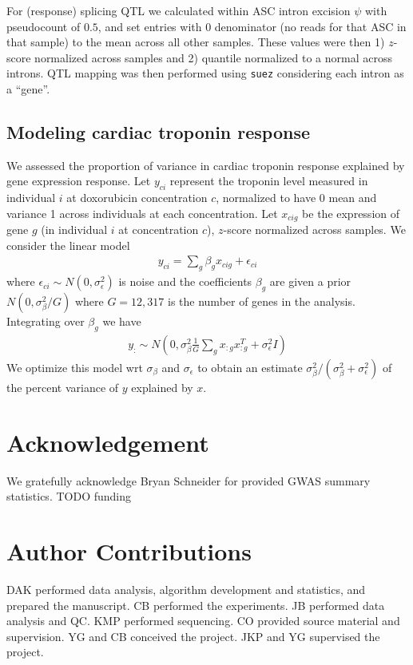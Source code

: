 \documentclass{article}
\begin{document}
{For (response) splicing QTL we calculated within ASC intron excision $\psi$ with pseudocount of $0.5$, and set entries with $0$ denominator (no reads for that ASC in that sample) to the mean across all other samples. These values were then 1) $z$-score normalized across samples and 2) quantile normalized to a normal across introns. QTL mapping was then performed using \texttt{suez} considering each intron as a ``gene''. 

\subsection*{Modeling cardiac troponin response}

We assessed the proportion of variance in cardiac troponin response explained by gene expression response. Let $y_{ci}$ represent the troponin level measured in individual $i$ at doxorubicin concentration $c$, normalized to have 0 mean and variance 1 across individuals at each concentration. Let $x_{cig}$ be the expression of gene $g$ (in individual $i$ at concentration $c$), $z$-score normalized across samples. We consider the linear model 
\begin{align}
y_{ci} = \sum_g \beta_g x_{cig} + \epsilon_{ci}
\end{align}
where $\epsilon_{ci} \sim N(0,\sigma_\epsilon^2)$ is noise and the coefficients $\beta_g$ are given a prior $N(0, \sigma_\beta^2 / G )$ where $G=12,317$ is the number of genes in the analysis. Integrating over $\beta_g$ we have 
\begin{align}
y_{:} \sim N\left(0 , \sigma_\beta^2 \frac{1}{G} \sum_g x_{:g} x_{:g}^T + \sigma_\epsilon^2 I \right)
\end{align}
We optimize this model wrt $\sigma_\beta$ and $\sigma_\epsilon$ to obtain an estimate $\sigma_\beta^2 / (\sigma_\beta^2 + \sigma_\epsilon^2)$ of the percent variance of $y$ explained by $x$. 

\section*{Acknowledgement}

We gratefully acknowledge Bryan Schneider for provided GWAS summary statistics. 
TODO funding

\section*{Author Contributions}

DAK performed data analysis, algorithm development and statistics, and prepared the manuscript. 
CB performed the experiments. 
JB performed data analysis and QC. 
KMP performed sequencing. 
CO provided source material and supervision.
YG and CB conceived the project.
JKP and YG supervised the project.

}
\end{document}
